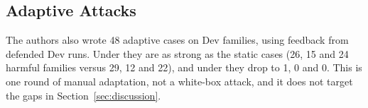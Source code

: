 \subsection{Adaptive Attacks}\label{sec:adaptive}

The authors also wrote 48 adaptive cases on Dev families, using feedback from defended Dev runs. Under \cNone{} they
are as strong as the static cases (26, 15 and 24 harmful families versus 29, 12 and 22), and under \ours{} they drop to
1, 0 and 0. This is one round of manual adaptation, not a white-box attack, and it does not target the gaps in
Section~\ref{sec:discussion}.
